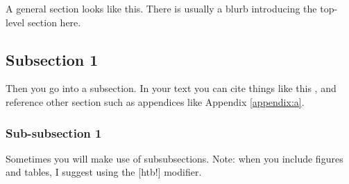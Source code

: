 A general section looks like this. There is usually a blurb introducing the top-level section here.

\subsection{Subsection 1}

Then you go into a subsection. In your text you can cite things like this \cite{ieee-ethics}, and reference other section such as appendices like Appendix \ref{appendix:a}.

\subsubsection{Sub-subsection 1}

Sometimes you will make use of subsubsections. Note: when you include figures and tables, I suggest using the [htb!] modifier.
